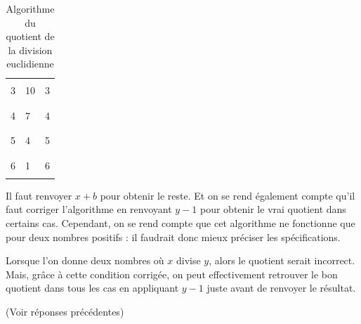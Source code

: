 \documentclass[11pt,a4paper]{article}
\begin{document}
\begin{table}[h!]
\begin{minipage}{0.4\textwidth}
\begin{tabular}{|C{1cm}|C{1cm}|C{1cm}|}
        \hline
             &    &       \\
        3    & 10 &   3   \\
             &    &       \\
        \hline
             &    &       \\
        4    &  7 &   4   \\
             &    &       \\
        \hline
             &    &       \\
        5    &  4 &   5   \\
             &    &       \\
        \hline
             &    &       \\
        6    &  1 &   6   \\
             &    &       \\
        \hline
    \end{tabular}
  \end{minipage}
  \caption{Algorithme du quotient de la division euclidienne}
  \label{division-euclidienne-quotient}
\end{table}

\bigskip


Il faut renvoyer $ x + b $ pour obtenir le reste. Et on se rend également compte qu'il faut corriger l'algorithme en renvoyant $ y - 1 $ pour obtenir le vrai quotient dans certains cas. Cependant, on se rend compte que cet algorithme ne fonctionne que pour deux nombres positifs : il faudrait donc mieux préciser les spécifications.

\bigskip


Lorsque l'on donne deux nombres où $ x $ divise $ y $, alors le quotient serait incorrect. Mais, grâce à cette condition corrigée, on peut effectivement retrouver le bon quotient dans tous les cas en appliquant $ y - 1 $ juste avant de renvoyer le résultat.


(Voir réponses précédentes)

\bigskip
\end{document}
